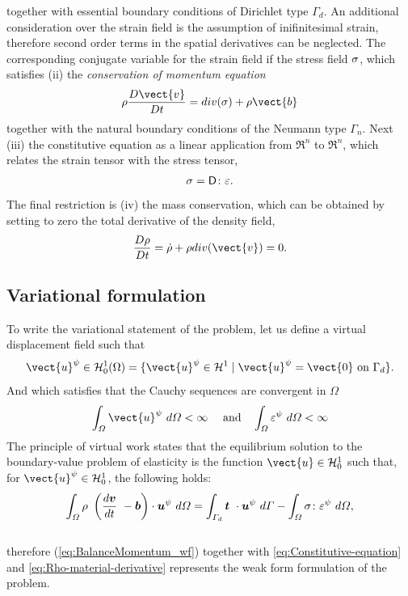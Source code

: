together with essential boundary conditions of Dirichlet type
$\varGamma_d$. An additional consideration over the strain field is
the assumption of inifinitesimal strain, therefore second order terms
in the spatial derivatives can be neglected. The corresponding
conjugate variable for the strain field if the stress field
$\mathsf{\sigma}$, which satisfies (ii) the \textit{conservation of
  momentum equation}
\begin{equation}
  \label{eq:Balance-momentum}
\rho \frac{D\vect{v}}{Dt} = \Div{\tens{\sigma}} + \rho \vect{b}
\end{equation}
together with the natural boundary conditions of the Neumann type
$\varGamma_n$. Next (iii) the constitutive equation as a linear
application from $\Re^n$ to  $\Re^n$, which relates the
strain tensor with the stress tensor,
\begin{equation}
  \label{eq:Constitutive-equation}
\mathsf{\sigma} = \mathsf{D} \colon \mathsf{\varepsilon}.
\end{equation}
The final restriction is (iv) the mass conservation, which can be obtained by
setting to zero the total derivative of the density field,
\begin{equation}
  \label{eq:Rho-material-derivative}
  \frac{D \rho}{D t} = \dot{\rho} + \rho \Div{\vect{v}} = 0.
\end{equation}

\subsection{Variational formulation}
\label{sec:variational-formulation}
To write the variational statement of the problem, let us define a
virtual displacement field such that
\begin{equation}
  \label{eq:Hilbert-space}
  \vect{u}^{\psi} \in \mathcal{H}^1_0(\Omega) = \{ \vect{u}^{\psi} \in
  \mathcal{H}^1 \mid \vect{u}^{\psi} = \vect{0}\ \text{on}\ \Gamma_d \}.
\end{equation}
And which satisfies that the Cauchy sequences are convergent in $\varOmega$
\begin{equation}
  \label{eq:cauchy-secuence}
  \Integral{3}{\vect{u}^{\psi}} < \infty\ \quad\text{and}\quad
  \Integral{3}{\tens{\varepsilon}^{\psi}} < \infty
\end{equation}
The principle of virtual work states that the equilibrium solution to
the boundary-value problem of elasticity is the function $\vect{u} \in
\mathcal{H}^1_0$ such that, for $\vect{u}^{\psi} \in
\mathcal{H}^1_0$, the following holds:
\begin{equation}
  \label{eq:BalanceMomentum_wf}
  \Integral{3}{\rho\ \left( \frac{d\vec{v}}{dt}\ - \vec{b} \right) \cdot \vec{u}^{\psi}} =
  \Integral{2}{\vec{t}\ \cdot \vec{u}^{\psi}} - \Integral{3}{\tens{\sigma} \colon
   \tens{\varepsilon}^{\psi}},
\end{equation}\\
therefore (\ref{eq:BalanceMomentum_wf}) together with
\eqref{eq:Constitutive-equation} and
\eqref{eq:Rho-material-derivative} represents the weak form
formulation of the problem.

